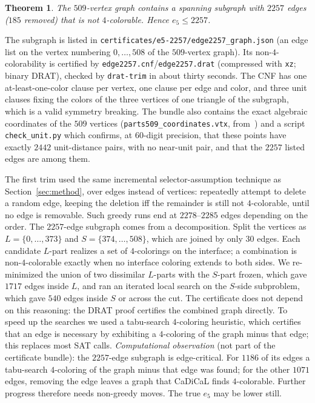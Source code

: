 \documentclass[11pt]{article}
\newtheorem{theorem}{Theorem}[section]
\theoremstyle{definition}
\theoremstyle{remark}
\begin{document}
\begin{theorem}\label{thm:e5}
The $509$-vertex graph contains a spanning subgraph with $2257$ edges
($185$ removed) that is not $4$-colorable.  Hence $e_5\le2257$.
\end{theorem}

The subgraph is listed in \texttt{certificates/e5-2257/edge2257\_graph.json}
(an edge list on the vertex numbering $0,\dots,508$ of the $509$-vertex
graph).  Its non-$4$-colorability is certified by
\texttt{edge2257.cnf}/\texttt{edge2257.drat} (compressed with
\texttt{xz}; binary DRAT), checked by \texttt{drat-trim} in about thirty seconds.  The
CNF has one at-least-one-color clause per vertex, one clause per edge
and color, and three unit clauses fixing the colors of the three
vertices of one triangle of the subgraph, which is a valid symmetry
breaking.  The bundle also contains the exact algebraic coordinates of the $509$
vertices (\texttt{parts509\_coordinates.vtx}, from~\cite{Parts20b}) and a
script \texttt{check\_unit.py} which confirms, at $60$-digit precision, that
these points have exactly $2442$ unit-distance pairs, with no near-unit pair,
and that the $2257$ listed edges are among them.

The first trim used the same incremental selector-assumption technique as
Section~\ref{sec:method}, over edges instead of vertices: repeatedly
attempt to delete a random edge, keeping the deletion iff the remainder
is still not $4$-colorable, until no edge is removable.  Such greedy
runs end at $2278$--$2285$ edges depending on the order.  The $2257$-edge
subgraph comes from a decomposition.  Split the vertices as
$L=\{0,\dots,373\}$ and $S=\{374,\dots,508\}$, which are joined by only
$30$ edges.  Each candidate $L$-part realizes a set of $4$-colorings on
the interface; a combination is non-$4$-colorable exactly when no
interface coloring extends to both sides.  We re-minimized the union of
two dissimilar $L$-parts with the $S$-part frozen, which gave $1717$ edges
inside $L$, and ran an iterated local search on the $S$-side subproblem,
which gave $540$ edges inside $S$ or across the cut.  The certificate does
not depend on this reasoning: the DRAT proof certifies the combined
graph directly.  To speed up the searches we used a tabu-search
$4$-coloring heuristic, which certifies that an edge is necessary by
exhibiting a $4$-coloring of the graph minus that edge; this
replaces most SAT calls.
\emph{Computational observation} (not part of the certificate bundle):
the $2257$-edge subgraph is edge-critical.  For $1186$ of its edges a
tabu-search $4$-coloring of the graph minus that edge was found; for the
other $1071$ edges, removing the edge leaves a graph that CaDiCaL finds
$4$-colorable.  Further progress therefore needs non-greedy moves.  The
true $e_5$ may be lower still.
\end{document}
